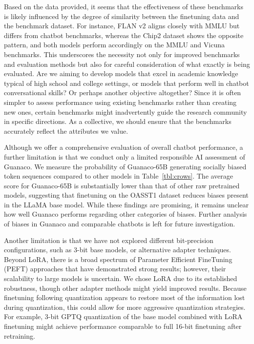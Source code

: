 Based on the data provided, it seems that the effectiveness of these benchmarks is likely influenced by the degree of similarity between the finetuning data and the benchmark dataset. For instance, FLAN v2 aligns closely with MMLU but differs from chatbot benchmarks, whereas the Chip2 dataset shows the opposite pattern, and both models perform accordingly on the MMLU and Vicuna benchmarks. This underscores the necessity not only for improved benchmarks and evaluation methods but also for careful consideration of what exactly is being evaluated. Are we aiming to develop models that excel in academic knowledge typical of high school and college settings, or models that perform well in chatbot conversational skills? Or perhaps another objective altogether? Since it is often simpler to assess performance using existing benchmarks rather than creating new ones, certain benchmarks might inadvertently guide the research community in specific directions. As a collective, we should ensure that the benchmarks accurately reflect the attributes we value.

Although we offer a comprehensive evaluation of overall chatbot performance, a further limitation is that we conduct only a limited responsible AI assessment of {Guanaco}. We measure the probability of {Guanaco}-65B generating socially biased token sequences compared to other models in Table~\ref{tbl:crows}. The average score for {Guanaco}-65B is substantially lower than that of other raw pretrained models, suggesting that finetuning on the OASST1 dataset reduces biases present in the LLaMA base model. While these findings are promising, it remains unclear how well {Guanaco} performs regarding other categories of biases. Further analysis of biases in {Guanaco} and comparable chatbots is left for future investigation.

Another limitation is that we have not explored different bit-precision configurations, such as 3-bit base models, or alternative adapter techniques. Beyond LoRA, there is a broad spectrum of Parameter Efficient FineTuning (PEFT) approaches that have demonstrated strong results; however, their scalability to large models is uncertain. We chose LoRA due to its established robustness, though other adapter methods might yield improved results. Because finetuning following quantization appears to restore most of the information lost during quantization, this could allow for more aggressive quantization strategies. For example, 3-bit GPTQ quantization of the base model combined with LoRA finetuning might achieve performance comparable to full 16-bit finetuning after retraining.

